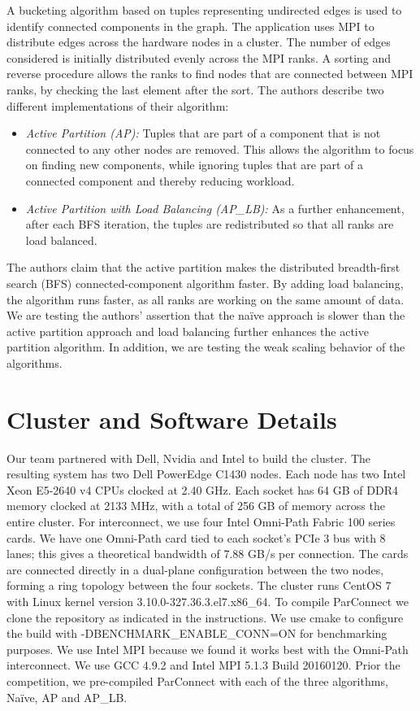 \documentclass[11pt]{elsarticle}
\begin{document}
A bucketing algorithm based on tuples representing undirected edges is used to identify connected components in the graph. 
The application uses MPI to distribute edges across the hardware nodes in a cluster.  The number of edges considered is initially
distributed evenly across the MPI ranks. A sorting and reverse procedure allows the ranks to find nodes that are connected between MPI
ranks, by checking the last element after the sort. 
The authors describe two different implementations of their algorithm:
\begin{itemize}
\item \textit{Active Partition (AP):}
Tuples that are part of a
component that is not connected to any other nodes are removed. This allows the algorithm to focus on finding new components, while
ignoring tuples that are part of a connected component and thereby reducing workload. 
\item \textit{Active Partition with Load Balancing (AP\_LB):}
As a further enhancement, after each BFS iteration, the tuples are redistributed so that all ranks are load balanced. 
\end{itemize}

The authors claim that the active partition makes the distributed breadth-first search (BFS) connected-component algorithm faster.   By adding load balancing, the algorithm runs faster, as all ranks are working on the same amount of data. We are testing the authors' assertion that the na{\"i}ve approach is slower than the active partition approach and load balancing further enhances the active partition algorithm. In addition, we are testing the weak scaling behavior of the algorithms.

\section{Cluster and Software Details}
Our team partnered with Dell, Nvidia and Intel to build the cluster.  The resulting system
has two Dell PowerEdge C1430 nodes. Each node has two Intel Xeon E5-2640 v4 CPUs clocked at 2.40 GHz. Each socket has 64 GB of DDR4 memory clocked at 2133 MHz, with a total of 256 GB of memory across the entire cluster. For interconnect, we use four Intel Omni-Path Fabric 100 series cards. We have one Omni-Path card tied to each socket's PCIe 3 bus with 8 lanes; this gives a theoretical bandwidth of 7.88 GB/s per connection.  The cards are connected directly in a dual-plane configuration between the two nodes, forming a ring topology between the four sockets. The cluster runs CentOS 7 with Linux kernel version 3.10.0-327.36.3.el7.x86\_64.
 To compile ParConnect we clone the repository as indicated in the instructions. We use cmake to configure the build with
 -DBENCHMARK\_ENABLE\_CONN=ON for benchmarking purposes. We use Intel MPI because we found it works best with the Omni-Path interconnect.  We use GCC 4.9.2 and Intel MPI 5.1.3 Build 20160120. Prior the competition, we pre-compiled ParConnect with each of the three algorithms, Na{\"i}ve, AP and AP\_LB. 
 
\end{document}
